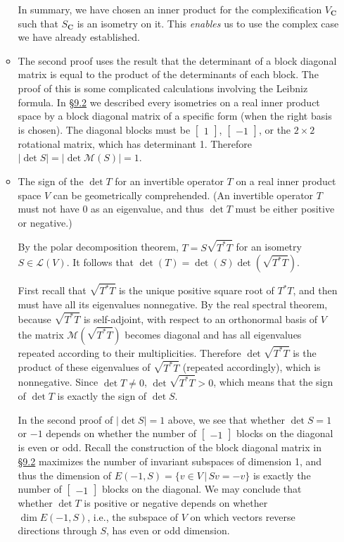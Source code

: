\documentclass[11pt]{article}
\newcommand{\lk}[2]{\hyperlink{subsection.#1.#2}{\S#1.#2}}
\newcommand{\where}{\,|\,}
\newcommand{\C}{\mathbf{C}}
\renewcommand{\d}{\dim}
\newcommand{\abs}[1]{\lvert #1 \rvert}
\newcommand{\LV}{\mathcal{L}(V)}
\newcommand{\M}{\mathcal{M}}
\begin{document}
\begin{itemize}
\begin{itemize}
        In summary, we have chosen an inner product for the complexification $V_\C$ such that $S_\C$ is an isometry on it. This \emph{enables} us to use the complex case we have already established.
        \item The second proof uses the result that the determinant of a block diagonal matrix is equal to the product of the determinants of each block. The proof of this is some complicated calculations involving the Leibniz formula. In \lk{9}{2} we described every isometries on a real inner product space by a block diagonal matrix of a specific form (when the right basis is chosen). The diagonal blocks must be $\begin{bmatrix}
        1
        \end{bmatrix}$, $\begin{bmatrix}
        -1
        \end{bmatrix}$, or the $2\times 2$ rotational matrix, which has determinant 1. Therefore $\abs{\det S} = \abs{\det \M(S)} = 1$.
        \item The sign of the $\det T$ for an invertible operator $T$ on a real inner product space $V$ can be geometrically comprehended. (An invertible operator $T$ must not have 0 as an eigenvalue, and thus $\det T$ must be either positive or negative.)
        
        By the polar decomposition theorem, $T = S \sqrt{T^*T}$ for an isometry $S \in \LV$. It follows that $\det(T) = \det(S) \det(\sqrt{T^*T})$.
        
        First recall that $\sqrt{T^*T}$ is the unique positive square root of $T^*T$, and then must have all its eigenvalues nonnegative. By the real spectral theorem, because $\sqrt{T^*T}$ is self-adjoint, with respect to an orthonormal basis of $V$ the matrix $\M(\sqrt{T^*T})$ becomes diagonal and has all eigenvalues repeated according to their multiplicities. Therefore $\det \sqrt{T^*T}$ is the product of these eigenvalues of $\sqrt{T^*T}$ (repeated accordingly), which is nonnegative. Since $\det T \neq 0$, $\det \sqrt{T^*T} > 0$, which means that the sign of $\det T$ is exactly the sign of $\det S$.
        
        In the second proof of $\abs{\det S} = 1$ above, we see that whether $\det S = 1$ or $-1$ depends on whether the number of $\begin{bmatrix}
        -1
        \end{bmatrix}$ blocks on the diagonal is even or odd. Recall the construction of the block diagonal matrix in \lk{9}{2} maximizes the number of invariant subspaces of dimension 1, and thus the dimension of $E(-1,S) = \{v \in V \where Sv = -v\}$ is exactly the number of $\begin{bmatrix}
        -1
        \end{bmatrix}$ blocks on the diagonal. We may conclude that whether $\det T$ is positive or negative depends on whether $\d E(-1,S)$, i.e., the subspace of $V$ on which vectors reverse directions through $S$, has even or odd dimension.
        

\end{itemize}
\end{itemize}
\end{document}
